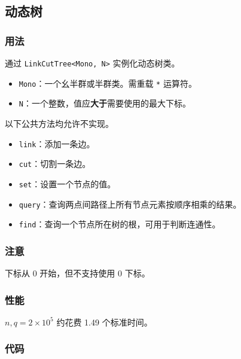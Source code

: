 \subsection{动态树}

\subsubsection{用法}

通过 \lstinline{LinkCutTree<Mono, N>} 实例化动态树类。

\begin{itemize}
\item \lstinline{Mono}：一个幺半群或半群类。需重载 \lstinline{*} 运算符。
\item \lstinline{N}：一个整数，值应\textbf{大于}需要使用的最大下标。
\end{itemize}

以下公共方法均允许不实现。

\begin{itemize}
\item \lstinline{link}：添加一条边。
\item \lstinline{cut}：切割一条边。
\item \lstinline{set}：设置一个节点的值。
\item \lstinline{query}：查询两点间路径上所有节点元素按顺序相乘的结果。
\item \lstinline{find}：查询一个节点所在树的根，可用于判断连通性。
\end{itemize}

\subsubsection{注意}

下标从 0 开始，但不支持使用 0 下标。

\subsubsection{性能}

$n, q = 2\times 10^5$ 约花费 1.49 个标准时间。

\subsubsection{代码}


